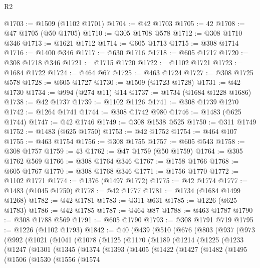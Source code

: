 \begin{lexlean}{R2}
\begin{coremodule}
@1703 := @1509 (@1102 @1701)
@1704 := @42 @1703
@1705 := 42
@1708 := @47 @1705 (@50 @1705)
@1710 := @305 @1708 @578
@1712 := @308 @1710 @346
@1713 := @1621 @1712
@1714 := @605 @1713
@1715 := @308 @1714
@1716 := @1400 @346
@1717 := @630 @1716
@1718 := @605 @1717
@1720 := @308 @1718 @346
@1721 := @1715 @1720
@1722 := @1102 @1721
@1723 := @1684 @1722
@1724 := @464 @67
@1725 := @463 @1724
@1727 := @308 @1725 @578
@1728 := @605 @1727
@1730 := @1509 (@1723 @1728)
@1731 := @42 @1730
@1734 := @994 (@274 @11) @14
@1737 := @1734 (@1684 @1228 @1686)
@1738 := @42 @1737
@1739 := @1102 @1126
@1741 := @308 @1739 @1270
@1742 := @1264 @1741
@1744 := @308 @1742 @980
@1746 := @1483 (@625 @1744)
@1747 := @42 @1746
@1749 := @308 @1538 @525
@1750 := @311 @1749
@1752 := @1483 (@625 @1750)
@1753 := @42 @1752
@1754 := @464 @107
@1755 := @463 @1754
@1756 := @308 @1755
@1757 := @605 @543
@1758 := @308 @1757
@1759 := 43
@1762 := @47 @1759 (@50 @1759)
@1764 := @305 @1762 @569
@1766 := @308 @1764 @346
@1767 := @1758 @1766
@1768 := @605 @1767
@1770 := @308 @1768 @346
@1771 := @1756 @1770
@1772 := @1102 @1771
@1774 := @1376 (@1497 @1772)
@1775 := @42 @1774
@1777 := @1483 (@1045 @1750)
@1778 := @42 @1777
@1781 := @1734 (@1684 @1499 @1268)
@1782 := @42 @1781
@1783 := @311 @631
@1785 := @1226 (@625 @1783)
@1786 := @42 @1785
@1787 := @464 @87
@1788 := @463 @1787
@1790 := @308 @1788 @569
@1791 := @605 @1790
@1793 := @308 @1791 @719
@1795 := @1226 (@1102 @1793)
@1842 := @40
    (@439
      (@510
        (@676
          (@803
            (@937
              (@973
                (@992
                  (@1021
                    (@1041
                      (@1078
                        (@1125
                          (@1170
                            (@1189
                              (@1214
                                (@1225
                                  (@1233
                                    (@1247
                                      (@1301
                                        (@1345
                                          (@1374
                                            (@1393
                                              (@1405
                                                (@1422
                                                  (@1427
                                                    (@1482
                                                      (@1495
                                                        (@1506
                                                          (@1530
                                                            (@1556
                                                              (@1574

\end{coremodule}
\end{lexlean}
